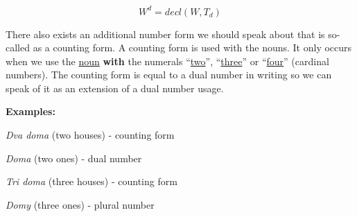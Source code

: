 $$ W^d =  decl(W, T_d) $$

There also exists an additional number form we should speak about that is so-called as a counting form. A counting form is used with the nouns. It only occurs when we use the \underline{noun} \textbf{with} the numerals “\underline{two}”, “\underline{three}” or “\underline{four}” (cardinal numbers). The counting form is equal to a dual number in writing so we can speak of it as an extension of a dual number usage.

\textbf{Examples:}

\textit{Dva doma} (two houses) - counting form

\textit{Doma} (two ones) - dual number

\textit{Tri doma} (three houses) - counting form

\textit{Domy} (three ones) - plural number 
